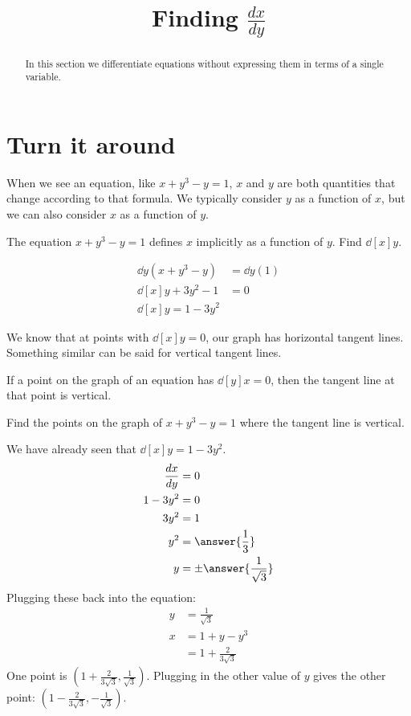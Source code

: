 \documentclass{ximera}
\title[Dig-In:]{Finding $\frac{dx}{dy}$}
\begin{document}
\begin{abstract}
In this section we differentiate equations without expressing them in
terms of a single variable.
\end{abstract}
\maketitle

\section{Turn it around}
	When we see an equation, like $x + y^3 - y = 1$, $x$ and $y$ are both quantities that change according to that formula.  We typically consider $y$ as a function of $x$, but we 
	can also consider $x$ as a function of $y$.

	\begin{example}
		The equation $x + y^3 - y = 1$ defines $x$ implicitly as a function of $y$.  Find $\dd[x]{y}$.
		
		\begin{explanation}
			\begin{align*}
				\dd{y} (x + y^3- y ) &= \dd{y} (1)\\
				\dd[x]{y} + 3y^2 - 1 &= 0\\
				\dd[x]{y} = 1 - 3y^2
			\end{align*}
		\end{explanation}
	\end{example}

	We know that at points with $\dd[x]{y} = 0$, our graph has horizontal tangent lines. Something similar can be said for vertical tangent lines.
	\begin{theorem}\index{vertical tangent lines}
		If a point on the graph of an equation has $\dd[y]{x}= 0$, then the tangent line at that point is vertical.
	\end{theorem}

	\begin{example}
		Find the points on the graph of $x + y^3 - y = 1$ where the tangent line is vertical.
		
		\begin{explanation}
			We have already seen that $\dd[x]{y}= 1-3y^2$.
			\begin{align*}
				\dd[x]{y} &= 0\\
				1 -3y^2 &= 0\\
				3y^2 &= 1\\
				y^2 &= \answer{\frac{1}{3}}\\
				y &= \pm \answer{\frac{1}{\sqrt{3}}}
			\end{align*}
			Plugging these back into the equation:
			\begin{align*}
				y &= \frac{1}{\sqrt{3}}\\
				x &= 1 + y - y^3\\
					&= 1 + \frac{2}{3\sqrt{3}}
			\end{align*}
				One point is $\left( 1 + \frac{2}{3\sqrt{3}} , \frac{1}{\sqrt{3}} \right)$.
				Plugging in the other value of $y$ gives the other point: $\left(  1 - \frac{2}{3\sqrt{3}} , -\frac{1}{\sqrt{3}}\right)$.
		\end{explanation}
	\end{example}
\end{document}
